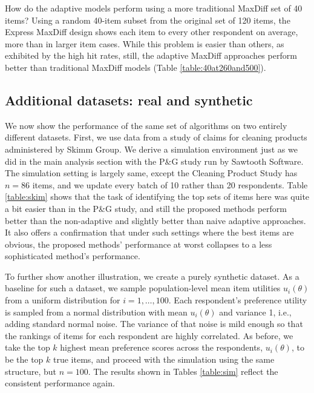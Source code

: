 \documentclass[nonblindrev]{informs3}
\newcommand{\numitems}{n}
\begin{document}
How do the adaptive models perform using a more traditional MaxDiff set of 40 items? Using a random 40-item subset from the original set of 120 items, the Express MaxDiff design shows each item to every other respondent on average, more than in larger item cases. While this problem is easier than others, as exhibited by the high hit rates, still, the adaptive MaxDiff approaches perform better than traditional MaxDiff models (Table \ref{table:40at260and500}).



\subsection{Additional datasets: real and synthetic}

We now show the performance of the same set of algorithms on two entirely different datasets. First, we use data from a study of claims for cleaning products administered by Skimm Group. We derive a simulation environment just as we did in the main analysis section with the P\&G study run by Sawtooth Software. The simulation setting is largely same, except the Cleaning Product Study has $\numitems=86$ items, and we update every batch of 10 rather than 20 respondents. Table \ref{table:skim} shows that the task of identifying the top sets of items here was quite a bit easier than in the P\&G study, and still the proposed methods perform better than the non-adaptive and slightly better than naive adaptive approaches. It also offers a confirmation that under such settings where the best items are obvious, the proposed methods' performance at worst collapses to a less sophisticated method's performance. 

To further show another illustration, we create a purely synthetic dataset. As a baseline for such a dataset, we sample population-level mean item utilities $u_i(\theta)$ from a uniform distribution for $i=1,\ldots,100$. Each respondent's preference utility is sampled from a normal distribution with mean $u_i(\theta)$ and variance 1, i.e., adding standard normal noise. The variance of that noise is mild enough so that the rankings of items for each respondent are highly correlated. As before, we take the top $k$ highest  mean preference scores across the respondents, $u_i(\theta)$,  to be the top $k$ true items, and proceed with the simulation using the same structure, but $\numitems=100$. The results shown in Tables \ref{table:sim} reflect the consistent performance again.
\end{document}
